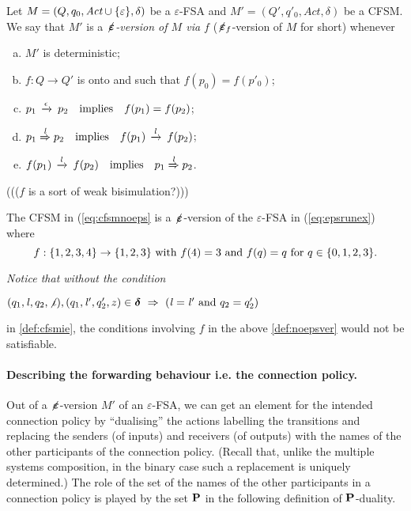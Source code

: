 \begin{definition}
\label{def:noepsver}
Let $M=(Q,q_0,\textit{Act}\cup\{\varepsilon\},\delta)$ be a $\varepsilon$-FSA
and $M'=(Q',q'_0,\textit{Act},\delta)$ be a CFSM.
We say that $M'$ is a {\em $\not\hspace{-1pt}\bm{\varepsilon}$-version of $M$ via $f$} ($\not\hspace{-1pt}\bm{\varepsilon}_f$-version of $M$ for short)
whenever 
\begin{enumerate}[a)]
\item
$M'$ is deterministic;
\item 
$f:Q\to Q'$ is onto and such that $f(p_0) = f(p'_0)$;
\item
$p_1\,\xrightarrow{\epsilon}_{{}}\,p_2 \quad\text{implies}\quad f(p_1)=f(p_2)$; 
\item
$p_1\LTS{\elle}p_2 \quad\text{implies}\quad f(p_1)\lts{\elle}f(p_2)$; 
\item
\label{def:noepsver-e}
$ f(p_1)\lts{\elle}f(p_2)\quad\text{implies}\quad p_1\LTS{\elle}p_2$.
\end{enumerate}
\end{definition}
((($f$ is a sort of weak bisimulation?)))

\smallskip
\noindent
The CFSM in (\ref{eq:cfsmnoeps} is a $\not\hspace{-1pt}\bm{\varepsilon}$-version of the $\varepsilon$-FSA in
(\ref{eq:epsrunex}) where 
\begin{equation}
\label{eq:f}
f:\{1,2,3,4\}\to\{1,2,3\} \text{ with } f(4)=3 \text{ and } f(q)=q \text{ for } q\in\{0,1,2,3\}.
\end{equation}

\begin{remark}
\label{rem:neccond}
{\em
Notice that without the condition\\
\centerline{
$(q_1,\mathit{l},q_2,\not\iota), (q_1,\mathit{l}',q'_2,z)\in\bm{\delta} ~\Rightarrow~ (\mathit{l}=\mathit{l}' \text{ and } q_2=q'_2)$}
in \cref{def:cfsmie}, the conditions involving $f$ in the above \cref{def:noepsver} would not be satisfiable. \finex
}
\end{remark}


\paragraph{Describing the forwarding behaviour i.e. the connection policy.}
Out of a $\not\hspace{-1pt}\bm{\varepsilon}$-version $M'$ of an $\varepsilon$-FSA, 
we can get an element for the intended connection policy by ``dualising'' the actions labelling the transitions and replacing the senders (of inputs) and receivers (of outputs) with
the names of the other participants of the connection policy. (Recall that, unlike the multiple systems
composition, in the binary case such a replacement is uniquely determined.) 
The role of the set of the names of the other participants in a connection policy
is played by the set $\mathbf{P}$ in the following definition of $\mathbf{P}$-duality.

